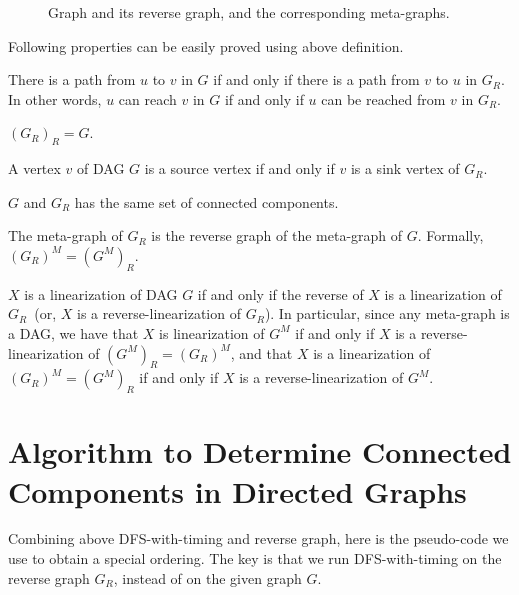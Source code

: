 \begin{figure}[h!]
\centering{}
\caption{Graph and its reverse graph, and the corresponding meta-graphs.}
\label{fig:reverse}
\end{figure}

Following properties can be easily proved using above definition.

\begin{property}
There is a path from $u$ to $v$ in $G$ if and only if there is a path from $v$ to $u$ in $G_R$.
In other words, $u$ can reach $v$ in $G$ if and only if $u$ can be reached from $v$ in $G_R$.
\end{property}

\begin{property}
$(G_R)_R = G$.
\end{property}

\begin{property}
A vertex $v$ of DAG $G$ is a source vertex if and only if $v$ is a sink vertex of $G_R$.
\end{property}


\begin{property}
$G$ and $G_R$ has the same set of connected components. %
\end{property}


\begin{property}
The meta-graph of $G_R$ is the reverse graph of the meta-graph of $G$. Formally, $(G_R)^M = (G^M)_R$.
\end{property}

\begin{property}
$X$ is a linearization of DAG $G$ if and only if the reverse of $X$ is a linearization of $G_R$~(or, $X$ is a reverse-linearization of $G_R$).
In particular, since any meta-graph is a DAG, we have that 
$X$ is linearization of $G^M$ if and only if $X$ is a reverse-linearization of $(G^M)_R = (G_R)^M$,
and that $X$ is a linearization of $(G_R)^M = (G^M)_R$ if and only if $X$ is a reverse-linearization of $G^M$.
\end{property}


\section*{Algorithm to Determine Connected Components in Directed Graphs}

Combining above DFS-with-timing and reverse graph, here is the pseudo-code we use to obtain a special ordering.
The key is that we run DFS-with-timing on the reverse graph $G_R$, instead of on the given graph $G$.

